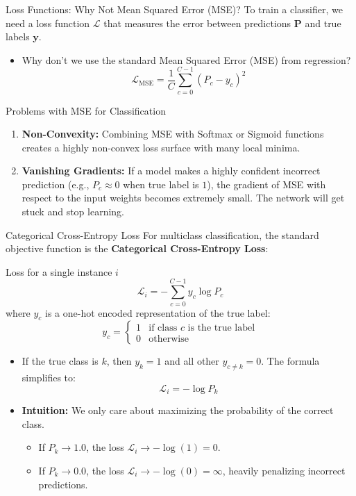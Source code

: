 \documentclass[9pt]{beamer}
\begin{document}
\begin{frame}{Loss Functions: Why Not Mean Squared Error (MSE)?}
  To train a classifier, we need a loss function $\mathcal{L}$ that measures the error between predictions $\mathbf{P}$ and true labels $\mathbf{y}$.
  \begin{itemize}
    \item Why don't we use the standard Mean Squared Error (MSE) from regression?
      $$\mathcal{L}_{\text{MSE}} = \frac{1}{C} \sum_{c=0}^{C-1} (P_c - y_c)^2$$
  \end{itemize}
  \begin{alertblock}{Problems with MSE for Classification}
    \begin{enumerate}
      \item \textbf{Non-Convexity:} Combining MSE with Softmax or Sigmoid functions creates a highly non-convex loss surface with many local minima.
      \item \textbf{Vanishing Gradients:} If a model makes a highly confident incorrect prediction (e.g., $P_c \approx 0$ when true label is $1$), the gradient of MSE with respect to the input weights becomes extremely small. The network will get stuck and stop learning.
    \end{enumerate}
  \end{alertblock}
\end{frame}

\begin{frame}{Categorical Cross-Entropy Loss}
  For multiclass classification, the standard objective function is the \textbf{Categorical Cross-Entropy Loss}:
  \begin{block}{Loss for a single instance $i$}
    $$\mathcal{L}_i = - \sum_{c=0}^{C-1} y_c \log P_c$$
    where $y_c$ is a one-hot encoded representation of the true label:
    $$y_c = \begin{cases} 1 & \text{if class } c \text{ is the true label} \\ 0 & \text{otherwise} \end{cases}$$
  \end{block}
  \begin{itemize}
    \item If the true class is $k$, then $y_k=1$ and all other $y_{c \neq k} = 0$. The formula simplifies to:
      $$\mathcal{L}_i = - \log P_k$$
    \item \textbf{Intuition:} We only care about maximizing the probability of the correct class.
      \begin{itemize}
        \item If $P_k \to 1.0$, the loss $\mathcal{L}_i \to - \log(1) = 0$.
        \item If $P_k \to 0.0$, the loss $\mathcal{L}_i \to - \log(0) = \infty$, heavily penalizing incorrect predictions.
      \end{itemize}
  \end{itemize}
\end{frame}
\end{document}
